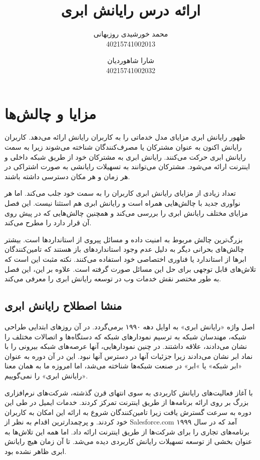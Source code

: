 \documentclass{book}
\title{ارائه درس رایانش ابری}
\author{محمد خورشیدی روزبهانی\\40215741002013 \and شارا شاهوردیان\\40215741002032}
\date{}
\begin{document}
    \maketitle

    \tableofcontents

    \newpage

    \chapter{مزایا و چالش‌ها}

        ظهور رایانش ابری مزایای مدل خدماتی را به کاربران رایانش ارائه می‌دهد. کاربران رایانش اکنون به عنوان مشترکان یا مصرف‌کنندگان شناخته می‌شوند زیرا به سمت رایانش ابری حرکت می‌کنند. رایانش ابری به مشترکان خود از طریق شبکه داخلی و اینترنت ارائه می‌شود. مشترکان می‌توانند به تسهیلات رایانشی به صورت اشتراکی در هر زمان و هر مکان دسترسی داشته باشند.

        تعداد زیادی از مزایای رایانش ابری کاربران را به سمت خود جلب می‌کند. اما هر نوآوری جدید با چالش‌هایی همراه است و رایانش ابری هم استثنا نیست. این فصل مزایای مختلف رایانش ابری را بررسی می‌کند و همچنین چالش‌هایی که در پیش روی آن قرار دارد را مطرح می‌کند.
    
        بزرگ‌ترین چالش مربوط به امنیت داده و مسائل پیروی از استانداردها است. بیشتر چالش‌های بحرانی دیگر به دلیل عدم وجود استانداردهای باز هستند که تامین‌کنندگان ابرها از استاندارد یا فناوری اختصاصی خود استفاده می‌کنند. نکته مثبت این است که تلاش‌های قابل توجهی برای حل این مسائل صورت گرفته است. علاوه بر این، این فصل به طور مختصر نقش خدمات وب در توسعه رایانش ابری را 
        معرفی می‌کند.

        \section{منشا اصطلاح رایانش ابری}

            اصل واژه «رایانش ابری» به اوایل دهه ۱۹۹۰ برمی‌گردد. در آن روزهای ابتدایی طراحی شبکه، مهندسان شبکه به ترسیم نمودارهای شبکه که دستگاه‌ها و اتصالات مختلف را نشان می‌دادند، علاقه داشتند. در چنین نمودارهایی، آنها عرصه‌های شبکه بیرونی را با نماد ابر نشان می‌دادند زیرا جزئیات آنها در دسترس آنها نبود. این در آن دوره به عنوان «ابر شبکه» یا »ابر» در صنعت شبکه‌ها شناخته می‌شد، اما امروزه ما به همان معنا «رایانش ابری» را نمی‌گوییم.

            با آغاز فعالیت‌های رایانش کاربردی به سوی انتهای قرن گذشته، شرکت‌های نرم‌افزاری بزرگ بر روی ارائه برنامه‌ها از طریق اینترنت تمرکز کردند. خدمات ایمیل در طی این دوره به سرعت گسترش یافت زیرا تامین‌کنندگان شروع به ارائه این امکان به کاربران خود کردند. و پرچمدارترین اقدام به نظر از Salesforce.com آمد که در سال ۱۹۹۹ برنامه‌های تجاری را برای شرکت‌ها از طریق اینترنت ارائه داد. اما همه این تلاش‌ها به عنوان بخشی از توسعه تسهیلات رایانش کاربردی دیده می‌شد. تا آن زمان هیچ رایانش ابری ظاهر نشده بود.
\end{document}
